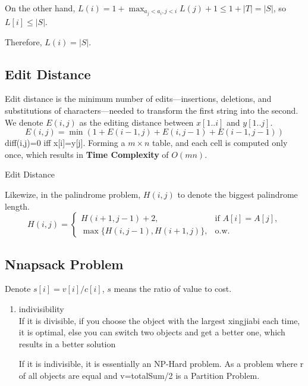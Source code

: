 On the other hand, $L(i)=1+\max_{a_j<a_i,j<i}{L(j)+1}\leq 1+|T|=|S|$, so $L[i]\leq |S|$.

Therefore, $L(i)=|S|$.

\subsection{Edit Distance}
Edit distance is the minimum number of edits—insertions, deletions, and substitutions of characters—needed to transform
the first string into the second.
We denote $E(i,j)$ as the editing distance between $x[1..i]$ and $y[1..j]$.
\[
    E(i,j)=\min(1+E(i-1,j)+E(i,j-1)+E(i-1,j-1))
\]
diff(i,j)=0 iff x[i]=y[j].
Forming a $m \times n$ table, and each cell is computed only once, which results in \textbf{Time Complexity} of $O(mn)$.

\begin{algorithm}
    \caption{Edit Distance}
    \;
\end{algorithm}

Likewize, in the palindrome problem,
$H(i,j)$ to denote the biggest palindrome length.
\begin{equation}
H(i,j)= 
\begin{cases}
H(i+1,j-1)+2, & \text{if } A[i]=A[j],\\
\max\{H(i,j-1),H(i+1,j)\}, & \text{o.w.}
\end{cases}
\end{equation}

\subsection{Nnapsack Problem}
Denote $s[i]=v[i]/c[i]$, $s$ means the ratio of value to cost.
\begin{enumerate}
    \item indivisibility\\
    If it is divisible, if you choose the object with the largest xingjiabi each time, it is optimal, else you can switch two objects and get a better one, which results in a better solution 

    If it is indivisible, it is essentially an NP-Hard problem. As a problem where r of all objects are equal and v=totalSum/2 is a Partition Problem.
\end{enumerate}

